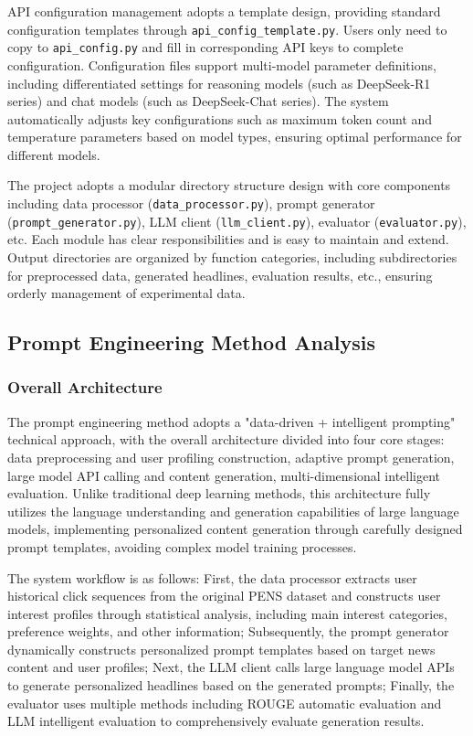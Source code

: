 \documentclass[10pt,a4paper]{article}
\begin{document}
API configuration management adopts a template design, providing standard configuration templates through \texttt{api\_config\_template.py}. Users only need to copy to \texttt{api\_config.py} and fill in corresponding API keys to complete configuration. Configuration files support multi-model parameter definitions, including differentiated settings for reasoning models (such as DeepSeek-R1 series) and chat models (such as DeepSeek-Chat series). The system automatically adjusts key configurations such as maximum token count and temperature parameters based on model types, ensuring optimal performance for different models.

The project adopts a modular directory structure design with core components including data processor (\texttt{data\_processor.py}), prompt generator (\texttt{prompt\_generator.py}), LLM client (\texttt{llm\_client.py}), evaluator (\texttt{evaluator.py}), etc. Each module has clear responsibilities and is easy to maintain and extend. Output directories are organized by function categories, including subdirectories for preprocessed data, generated headlines, evaluation results, etc., ensuring orderly management of experimental data.

\subsection{Prompt Engineering Method Analysis}
\subsubsection{Overall Architecture}
The prompt engineering method adopts a "data-driven + intelligent prompting" technical approach, with the overall architecture divided into four core stages: data preprocessing and user profiling construction, adaptive prompt generation, large model API calling and content generation, multi-dimensional intelligent evaluation. Unlike traditional deep learning methods, this architecture fully utilizes the language understanding and generation capabilities of large language models, implementing personalized content generation through carefully designed prompt templates, avoiding complex model training processes.

The system workflow is as follows: First, the data processor extracts user historical click sequences from the original PENS dataset and constructs user interest profiles through statistical analysis, including main interest categories, preference weights, and other information; Subsequently, the prompt generator dynamically constructs personalized prompt templates based on target news content and user profiles; Next, the LLM client calls large language model APIs to generate personalized headlines based on the generated prompts; Finally, the evaluator uses multiple methods including ROUGE automatic evaluation and LLM intelligent evaluation to comprehensively evaluate generation results.
\end{document}
